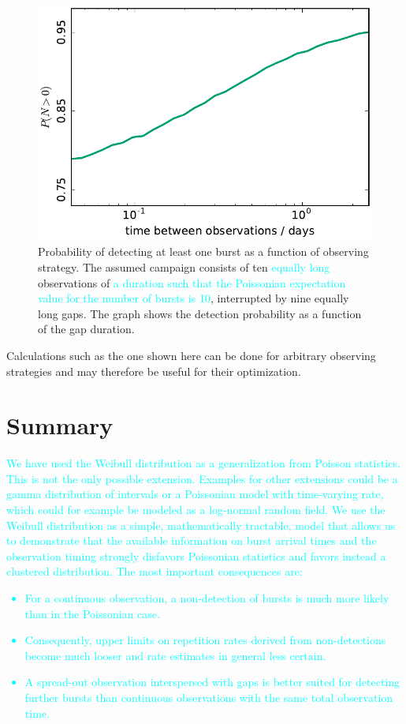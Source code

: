 \documentclass[fleqn,usenatbib]{mnras}
\newcommand{\new}[1]{\textcolor{cyan}{#1}}
\begin{document}
\begin{figure}
	\includegraphics[width=1.0\columnwidth]{obs_strategy.pdf}
	\caption{\label{fig:obs_strategy}Probability of detecting at least one burst as a function of observing strategy. The assumed campaign consists of ten \new{equally long} observations of \new{a duration such that the Poissonian expectation value for the number of bursts is 10}, interrupted by nine equally long gaps. The graph shows the detection probability as a function of the gap duration.}
\end{figure}

Calculations such as the one shown here can be done for arbitrary observing strategies and may therefore be useful for their optimization.


\section{Summary}
\label{sec:summary}


\new{We have used the Weibull distribution as a generalization from Poisson statistics. This is not the only possible extension. Examples for other extensions could be a gamma distribution of intervals or a Poissonian model with time-varying rate, which could for example be modeled as a log-normal random field. We use the Weibull distribution as a simple, mathematically tractable, model that allows us to demonstrate that the available information on burst arrival times and the observation timing strongly disfavors Poissonian statistics and favors instead a clustered distribution. The most important consequences are:
\begin{itemize}
	\item For a continuous observation, a non-detection of bursts is much more likely than in the Poissonian case.
	\item Consequently, upper limits on repetition rates derived from non-detections become much looser and rate estimates in general less certain.
	\item A spread-out observation interspersed with gaps is better suited for detecting further bursts than continuous observations with the same total observation time.
\end{itemize}}
\end{document}
